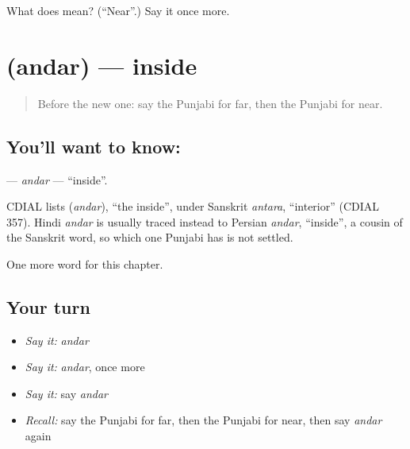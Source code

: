 \begin{tcolorbox}[breakable,colback=teal!4,colframe=teal!35!black,title={Before you move on}]
What does  mean? (\textquotedblleft{}Near\textquotedblright{}.) Say it once more.
\end{tcolorbox}
\section[\texorpdfstring{\pa{ਅੰਦਰ} (andar)}{ਅੰਦਰ (andar)}]{ (andar) — inside}

\label{lesson:PA-C88-andar}



\begin{quote}
Before the new one: say the Punjabi for far, then the Punjabi for near.
\end{quote}

\subsection*{You'll want to know: }
\textbf{} — \emph{andar} — \textquotedblleft{}inside\textquotedblright{}.

\begin{cousinweb}
CDIAL lists \textbf{} (\emph{andar}), \textquotedblleft{}the inside\textquotedblright{}, under Sanskrit \emph{antara}, \textquotedblleft{}interior\textquotedblright{} (CDIAL 357). Hindi \emph{andar} is usually traced instead to Persian \emph{andar}, \textquotedblleft{}inside\textquotedblright{}, a cousin of the Sanskrit word, so which one Punjabi has is not settled.
\end{cousinweb}

\begin{grammarlens}[title={What you've built}]
One more word for this chapter.
\end{grammarlens}

\subsection*{Your turn}
\begin{itemize}
\raggedright
  \item \emph{Say it:} \emph{andar}
  \item \emph{Say it:} \emph{andar}, once more
  \item \emph{Say it:} say \emph{andar}
  \item \emph{Recall:} say the Punjabi for far, then the Punjabi for near, then say \emph{andar} again
\end{itemize}

